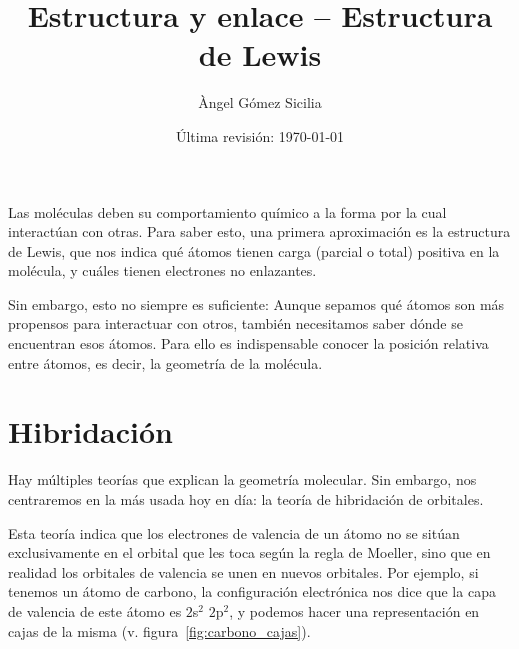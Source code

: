 \documentclass[twoside,a4paper,justified,12pt]{tufte-handout}
\title{Estructura y enlace -- Estructura de Lewis}
\author{Àngel Gómez Sicilia}
\date{Última revisión: \today}
\renewcommand{\sp}[1]{\ensuremath{^{#1}}}
\begin{document}
\shorthandoff{>}\shorthandoff{<}%

\maketitle
\thispagestyle{myFirstPage}

Las moléculas deben su comportamiento químico a la forma por la cual interactúan con otras. Para saber esto, una primera aproximación es la estructura de Lewis, que nos indica qué átomos tienen carga (parcial o total) positiva en la molécula, y cuáles tienen electrones no enlazantes.

Sin embargo, esto no siempre es suficiente: Aunque sepamos qué átomos son más propensos para interactuar con otros, también necesitamos saber dónde se encuentran esos átomos. Para ello es indispensable conocer la posición relativa entre átomos, es decir, la geometría de la molécula.

\section{Hibridación}

Hay múltiples teorías que explican la geometría molecular. Sin embargo, nos centraremos en la más usada hoy en día: la teoría de hibridación de orbitales.

Esta teoría indica que los electrones de valencia de un átomo no se sitúan exclusivamente en el orbital que les toca según la regla de Moeller, sino que en realidad los orbitales de valencia se unen en nuevos orbitales. Por ejemplo, si tenemos un átomo de carbono, la configuración electrónica nos dice que la capa de valencia de este átomo es $2$s\sp{2} $2$p\sp{2}, y podemos hacer una representación en cajas de la misma (v. figura~\ref{fig:carbono_cajas}).
\end{document}
